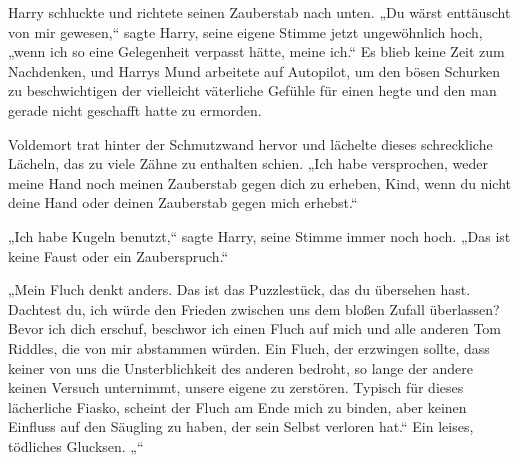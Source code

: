 Harry schluckte und richtete seinen Zauberstab nach unten.
„Du wärst enttäuscht von mir gewesen,“ sagte Harry, seine eigene Stimme jetzt ungewöhnlich hoch, „wenn ich so eine Gelegenheit verpasst hätte, meine ich.“
Es blieb keine Zeit zum Nachdenken, und Harrys Mund arbeitete auf Autopilot, um den bösen Schurken zu beschwichtigen der vielleicht väterliche Gefühle für einen hegte und den man gerade nicht geschafft hatte zu ermorden.

Voldemort trat hinter der Schmutzwand hervor und lächelte dieses schreckliche Lächeln, das zu viele Zähne zu enthalten schien.
„Ich habe versprochen, weder meine Hand noch meinen Zauberstab gegen dich zu erheben, Kind, wenn du nicht deine Hand oder deinen Zauberstab gegen mich erhebst.“

„Ich habe Kugeln benutzt,“ sagte Harry, seine Stimme immer noch hoch. „Das ist keine Faust oder ein Zauberspruch.“

„Mein Fluch denkt anders. Das ist das Puzzlestück, das du übersehen hast. Dachtest du, ich würde den Frieden zwischen uns dem bloßen Zufall überlassen? Bevor ich dich erschuf, beschwor ich einen Fluch auf mich und alle anderen Tom Riddles, die von mir abstammen würden. Ein Fluch, der erzwingen sollte, dass keiner von uns die Unsterblichkeit des anderen bedroht, so lange der andere keinen Versuch unternimmt, unsere eigene zu zerstören. Typisch für dieses lächerliche Fiasko, scheint der Fluch am Ende mich zu binden, aber keinen Einfluss auf den Säugling zu haben, der sein Selbst verloren hat.“
Ein leises, tödliches Glucksen.
„“

